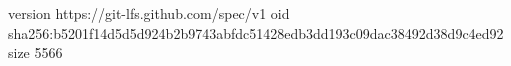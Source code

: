 version https://git-lfs.github.com/spec/v1
oid sha256:b5201f14d5d5d924b2b9743abfdc51428edb3dd193c09dac38492d38d9c4ed92
size 5566
